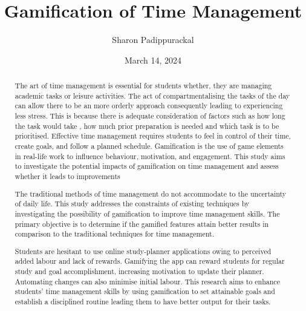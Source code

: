 \documentclass{l4proj}
\begin{document}
\title{Gamification of Time Management}
\author{Sharon Padippurackal}
\date{March 14, 2024}

\maketitle

\begin{abstract}
    The art of time management is essential for students whether, they are managing academic tasks or leisure activities. The act of compartmentalising  the tasks of the day can allow there to be an more orderly approach  consequently leading to experiencing less stress. This is because there is adequate consideration of factors such as how long the task would take , how much prior preparation is needed and which task is to be prioritised. Effective time management requires students to feel in control of their time, create goals, and follow a planned schedule. Gamification is the use of game elements in real-life work to influence behaviour, motivation, and engagement. This study aims to investigate the potential impacts of gamification on time management and assess whether it leads to improvements

    
    The traditional methods of time management do not accommodate to the uncertainty of daily life. This study addresses the constraints of existing techniques by investigating the possibility of gamification to improve time management skills. The primary objective is to determine if the gamified features attain better results in comparison to the traditional techniques for time management.

Students are hesitant to use online study-planner applications owing to perceived added labour and lack of rewards. Gamifying the app can reward students for regular study and goal accomplishment, increasing motivation to update their planner. Automating changes can also minimise initial labour. This research aims to enhance students' time management skills by using gamification to set attainable goals and establish a disciplined routine leading them to have better output for their tasks.


\end{abstract}
\end{document}
